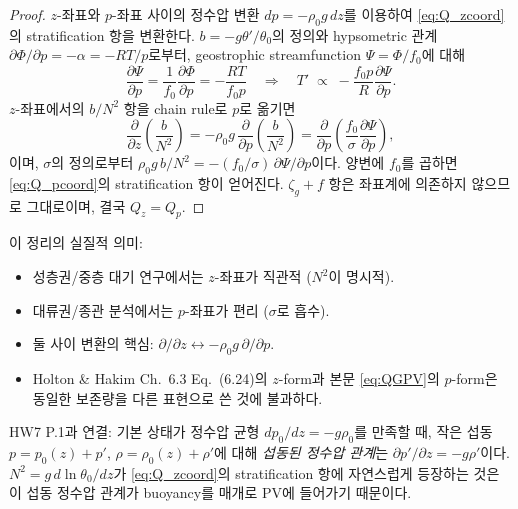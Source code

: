\begin{proof}
$z$-좌표와 $p$-좌표 사이의 정수압 변환 $dp = -\rho_0 g\,dz$를 이용하여
\eqref{eq:Q_zcoord}의 stratification 항을 변환한다.
$b = -g\theta'/\theta_0$의 정의와 hypsometric 관계
$\partial\Phi/\partial p = -\alpha = -RT/p$로부터, geostrophic streamfunction
$\Psi = \Phi/f_0$에 대해
\[
  \frac{\partial\Psi}{\partial p}
  = \frac{1}{f_0}\frac{\partial\Phi}{\partial p}
  = -\frac{RT}{f_0 p}
  \quad\Longrightarrow\quad
  T' \;\propto\; -\frac{f_0 p}{R}\frac{\partial\Psi}{\partial p}.
\]
$z$-좌표에서의 $b/N^2$ 항을 chain rule로 $p$로 옮기면
\[
  \frac{\partial}{\partial z}\!\left(\frac{b}{N^2}\right)
  = -\rho_0 g\,\frac{\partial}{\partial p}\!
    \left(\frac{b}{N^2}\right)
  = \frac{\partial}{\partial p}\!
    \left(\frac{f_0}{\sigma}\frac{\partial\Psi}{\partial p}\right),
\]
이며, $\sigma$의 정의로부터 $\rho_0 g\,b/N^2 = -(f_0/\sigma)\,\partial\Psi/\partial p$이다.
양변에 $f_0$를 곱하면 \eqref{eq:Q_pcoord}의 stratification 항이 얻어진다.
$\zeta_g + f$ 항은 좌표계에 의존하지 않으므로 그대로이며, 결국 $Q_z = Q_p$.
\end{proof}

\begin{hisublock}
이 정리의 실질적 의미:
\begin{itemize}
  \item 성층권/중층 대기 연구에서는 $z$-좌표가 직관적 ($N^2$이 명시적).
  \item 대류권/종관 분석에서는 $p$-좌표가 편리 ($\sigma$로 흡수).
  \item 둘 사이 변환의 핵심: $\partial/\partial z \leftrightarrow -\rho_0 g\,\partial/\partial p$.
  \item Holton \& Hakim Ch.~6.3 Eq.~(6.24)의 $z$-form과 본문 \eqref{eq:QGPV}의 $p$-form은
        동일한 보존량을 다른 표현으로 쓴 것에 불과하다.
\end{itemize}
\end{hisublock}

\begin{remark}\label{rem:ch04_hw7_hydrostat}
HW7 P.1과 연결: 기본 상태가 정수압 균형
$dp_0/dz = -g\rho_0$를 만족할 때, 작은 섭동
$p = p_0(z) + p'$, $\rho = \rho_0(z) + \rho'$에 대해 \emph{섭동된 정수압 관계}는
$\partial p'/\partial z = -g\rho'$이다.  $N^2 = g\,d\ln\theta_0/dz$가
\eqref{eq:Q_zcoord}의 stratification 항에 자연스럽게 등장하는 것은
이 섭동 정수압 관계가 buoyancy를 매개로 PV에 들어가기 때문이다.
\end{remark}

